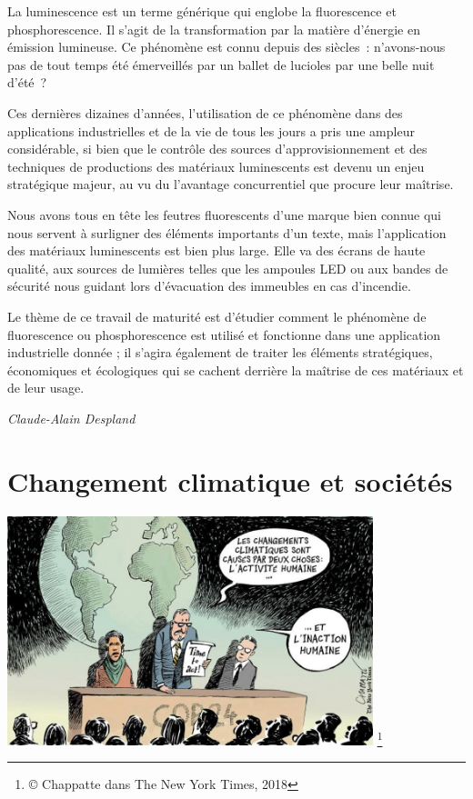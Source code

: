 \documentclass[
  10pt,
  french,
  a5paper,
  openany]{book}
\newenvironment{signature}{\begin{flushright}}{\end{flushright}}
\begin{document}

La luminescence est un terme générique qui englobe la fluorescence et phosphorescence. Il s'agit de la transformation par la matière d'énergie en émission lumineuse. Ce phénomène est connu depuis des siècles~: n'avons-nous pas de tout temps été émerveillés par un ballet de lucioles par une belle nuit d'été~?

Ces dernières dizaines d'années, l'utilisation de ce phénomène dans des applications industrielles et de la vie de tous les jours a pris une ampleur considérable, si bien que le contrôle des sources d'approvisionnement et des techniques de productions des matériaux luminescents est devenu un enjeu stratégique majeur, au vu du l'avantage concurrentiel que procure leur maîtrise.

Nous avons tous en tête les feutres fluorescents d'une marque bien connue qui nous servent à surligner des éléments importants d'un texte, mais l'application des matériaux luminescents est bien plus large. Elle va des écrans de haute qualité, aux sources de lumières telles que les ampoules LED ou aux bandes de sécurité nous guidant lors d'évacuation des immeubles en cas d'incendie.

\clearpage

Le thème de ce travail de maturité est d'étudier comment le phénomène de fluorescence ou phosphorescence est utilisé et fonctionne dans une application industrielle donnée ; il s'agira également de traiter les éléments stratégiques, économiques et écologiques qui se cachent derrière la maîtrise de ces matériaux et de leur usage.

\begin{signature}
\emph{Claude-Alain Despland}

\end{signature}

\hypertarget{changement-climatique-et-sociuxe9tuxe9s}{%
\chapter{Changement climatique et sociétés}\label{changement-climatique-et-sociuxe9tuxe9s}}

\begin{center}
\includegraphics[width=\textwidth,height=18em]{images/changement-climatique-et-societes.jpg}
\footnote{© Chappatte dans The New York Times, 2018}

\end{center}
\end{document}
